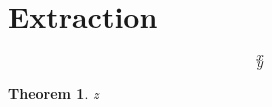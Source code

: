 \documentclass[twocolumn]{article}
\begin{document}
\section{Extraction}\label{sec:extractingTheDecomposition}
\begin{equation}\label{eq:JPcriterion}x\end{equation}\begin{equation}\label{eq:SDPlocc}y\end{equation}\newtheorem{theorem}{Theorem}\begin{theorem}\label{thm:LOCC}z\end{theorem}
\clearpage
\clearpage
\clearpage
\clearpage
\clearpage
\clearpage
\clearpage
\end{document}
